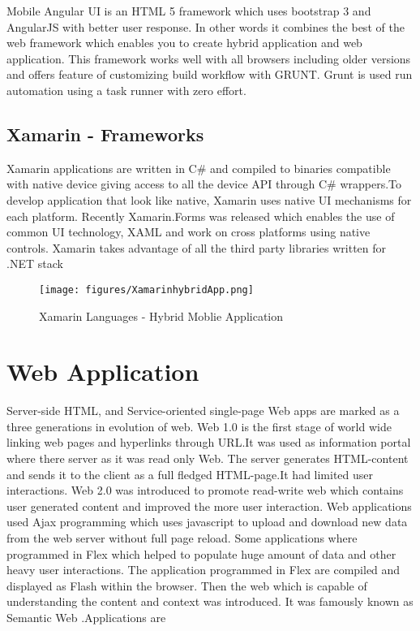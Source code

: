 			Mobile Angular UI is an HTML 5 framework which uses bootstrap 3 and AngularJS with better user response. In other words it combines the best of the web framework which enables you to create hybrid application and web application. This framework works well with all browsers including older versions and offers feature of customizing build workflow with GRUNT. Grunt is used run automation  using a task runner with zero effort.
			
\subsection{Xamarin - Frameworks}

				Xamarin applications are written in C\# and compiled to binaries compatible with native device giving access to all the device API through C\# wrappers.To develop application that look like native, Xamarin uses native UI mechanisms for each platform. Recently Xamarin.Forms was released which enables the use of common UI technology, XAML and work on cross platforms using native controls. Xamarin takes advantage of all the third party libraries written for .NET stack 

\begin{figure}[!htb]
  \texttt{[image: figures/XamarinhybridApp.png]}
	 \caption{ Xamarin Languages - Hybrid Moblie Application }
  \label{fig: Xamarin Languages - Hybrid Moblie Application}
\end{figure}							
			



\section{Web Application}

				Server-side HTML,  and Service-oriented single-page Web apps are marked as a three generations in evolution of web. Web 1.0 is the first stage of world wide linking web pages and hyperlinks through URL.It was used as information portal where there server  as it was read only Web. The server generates HTML-content and sends it to the client as a full fledged HTML-page.It had limited user interactions. Web 2.0 was introduced to promote read-write web which contains user generated content and improved the more user interaction. Web applications used Ajax programming which uses javascript to upload and download new data from the web server without full page reload. Some applications where programmed in Flex which helped to populate huge amount of data and other heavy user interactions. The application programmed in Flex are compiled and displayed as Flash within the browser. Then the web which is capable of understanding the content and context was introduced. It was famously known as Semantic Web .Applications are 

